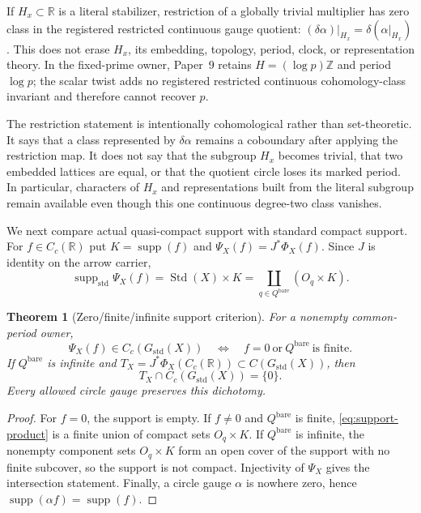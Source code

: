 \documentclass[11pt]{article}
\newtheorem{theorem}{Theorem}[section]
\theoremstyle{definition}
\newcommand{\R}{\mathbb R}
\newcommand{\Z}{\mathbb Z}
\newcommand{\Gstd}{G_{\mathrm{std}}}
\newcommand{\Qbare}{Q^{\mathrm{bare}}}
\newcommand{\Std}{\operatorname{Std}}
\newcommand{\supp}{\operatorname{supp}}
\begin{document}
If $H_x\subset\R$ is a literal stabilizer, restriction of a globally
trivial multiplier has zero class in the registered restricted continuous
gauge quotient: $(\delta\alpha)|_{H_x}=\delta(\alpha|_{H_x})$.  This does not
erase $H_x$, its embedding, topology, period, clock, or representation
theory.  In the fixed-prime owner, Paper~9 retains
$H=(\log p)\Z$ and period $\log p$; the scalar twist adds no registered
restricted continuous cohomology-class invariant and therefore cannot
recover $p$.

The restriction statement is intentionally cohomological rather than
set-theoretic.  It says that a class represented by $\delta\alpha$ remains a
coboundary after applying the restriction map.  It does not say that the
subgroup $H_x$ becomes trivial, that two embedded lattices are equal, or that
the quotient circle loses its marked period.  In particular, characters of
$H_x$ and representations built from the literal subgroup remain available
even though this one continuous degree-two class vanishes.

We next compare actual quasi-compact support with standard compact support.
For $f\in C_c(\R)$ put $K=\supp(f)$ and
$\Psi_X(f)=J^*\Phi_X(f)$.  Since $J$ is identity on the arrow carrier,
\begin{equation}\label{eq:support-product}
 \supp_{\mathrm{std}}\Psi_X(f)
   =\Std(X)\times K
   =\coprod_{q\in\Qbare}(O_q\times K).
\end{equation}

\begin{theorem}[Zero/finite/infinite support criterion]\label{thm:support}
For a nonempty common-period owner,
\[
 \Psi_X(f)\in C_c(\Gstd(X))
 \quad\Longleftrightarrow\quad
 f=0\ \text{or}\ \Qbare\ \text{is finite}.
\]
If $\Qbare$ is infinite and
$T_X=J^*\Phi_X(C_c(\R))\subset C(\Gstd(X))$, then
\[
 T_X\cap C_c(\Gstd(X))=\{0\}.
\]
Every allowed circle gauge preserves this dichotomy.
\end{theorem}

\begin{proof}
For $f=0$, the support is empty.  If $f\ne0$ and $\Qbare$ is finite,
\cref{eq:support-product} is a finite union of compact sets
$O_q\times K$.  If $\Qbare$ is infinite, the nonempty component sets
$O_q\times K$ form an open cover of the support with no finite subcover, so
the support is not compact.  Injectivity of $\Psi_X$ gives the intersection
statement.  Finally, a circle gauge $\alpha$ is nowhere zero, hence
$\supp(\alpha f)=\supp(f)$.
\end{proof}
\end{document}
